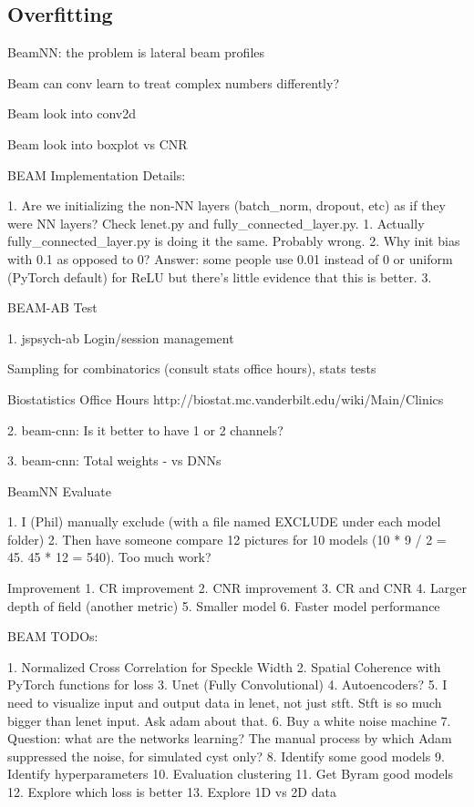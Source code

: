 \documentclass{article}
\begin{document}
\subsection{Overfitting}







BeamNN: the problem is lateral beam profiles

Beam can conv learn to treat complex numbers differently?

Beam look into conv2d

Beam look into boxplot vs CNR

BEAM Implementation Details:

1. Are we initializing the non-NN layers (batch_norm, dropout, etc) as if they were NN layers? Check lenet.py and fully_connected_layer.py.
    1. Actually fully_connected_layer.py is doing it the same. Probably wrong.
2. Why init bias with 0.1 as opposed to 0? Answer: some people use 0.01 instead of 0 or uniform (PyTorch default)  for ReLU but there’s little evidence that this is better.
3.

BEAM-AB Test

1. jspsych-ab Login/session management

Sampling for combinatorics (consult stats office hours), stats tests

Biostatistics Office Hours http://biostat.mc.vanderbilt.edu/wiki/Main/Clinics

2. beam-cnn: Is it better to have 1 or 2 channels?

3. beam-cnn: Total weights - vs DNNs

BeamNN Evaluate

1. I (Phil) manually exclude (with a file named EXCLUDE under each model folder)
2. Then have someone compare 12 pictures for 10 models (10 * 9 / 2 = 45. 45 * 12 = 540). Too much work?


Improvement
1. CR improvement
2. CNR improvement
3. CR and CNR
4. Larger depth of field (another metric)
5. Smaller model
6. Faster model performance


BEAM TODOs:

1. Normalized Cross Correlation for Speckle Width
2. Spatial Coherence with PyTorch functions for loss
3. Unet (Fully Convolutional)
4. Autoencoders?
5. I need to visualize input and output data in lenet, not just stft. Stft is so much bigger than lenet input. Ask adam about that.
6. Buy a white noise machine
7. Question: what are the networks learning? The manual process by which Adam suppressed the noise, for simulated cyst only?
8. Identify some good models
9. Identify hyperparameters
10. Evaluation clustering
11. Get Byram good models
12. Explore which loss is better
13. Explore 1D vs 2D data
\end{document}
